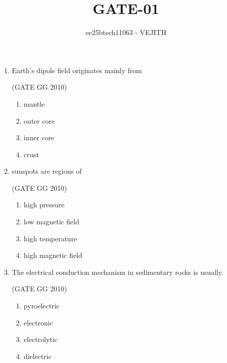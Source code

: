 \documentclass[journal]{IEEEtran}
\begin{document}
\title{GATE-01}
\author{ee25btech11063 - VEJITH}
\maketitle




\begin{enumerate}
\item Earth's dipole field originates mainly from

\hfill (GATE GG 2010)
\begin{multicols}{4}
\begin{enumerate}
\item mantle
\item outer core
\item inner core
\item crust
\end{enumerate}
\end{multicols}

\item  sunspots are regions of

\hfill (GATE GG 2010) 
\begin{multicols}{2}

\begin{enumerate}
\item high pressure
\item low magnetic field
\item high temperature
\item high magnetic field
\end{enumerate}
\end{multicols}

\item  The electrical conduction mechanism in  sedimentary rocks is usually.

\hfill (GATE GG 2010) 
\begin{multicols}{4}

\begin{enumerate}
\item pyroelectric
\item electronic
\item electrolytic
\item dielectric
\end{enumerate}
\end{multicols}



\end{enumerate}
\end{document}
